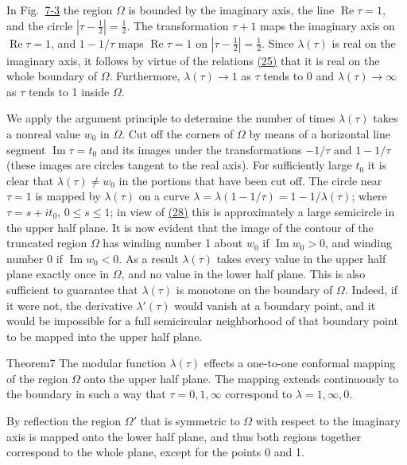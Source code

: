 In Fig.~\hyperref[fig:7-3]{7-3} the region $\Omega$ is bounded by the imaginary axis, the line $\operatorname{Re} \tau = 1$, and the circle $|\tau - \frac{1}{2}| = \frac{1}{2}$. The transformation $\tau + 1$ maps the imaginary axis on $\operatorname{Re} \tau = 1$, and $1 - 1/\tau$ maps $\operatorname{Re} \tau = 1$ on $|\tau - \frac{1}{2}| = \frac{1}{2}$. Since $\lambda(\tau)$ is real on the imaginary axis, it follows by virtue of the relations \hyperref[eq:7.25]{(25)} that it is real on the whole boundary of $\Omega$. Furthermore, $\lambda(\tau) \to 1$ as $\tau$ tends to 0 and $\lambda(\tau) \to \infty$ as $\tau$ tends to 1 inside $\Omega$.

We apply the argument principle to determine the number of times $\lambda(\tau)$ takes a nonreal value $w_{0}$ in $\Omega$. Cut off the corners of $\Omega$ by means of a
horizontal line segment $\operatorname{Im} \tau = t_0$ and its images under the transformations $-1/\tau$ and $1 - 1/\tau$ (these images are circles tangent to the real axis). For sufficiently large $t_0$ it is clear that $\lambda(\tau) \neq w_0$ in the portions that have been cut off. The circle near $\tau = 1$ is mapped by $\lambda(\tau)$ on a curve $\lambda = \lambda(1 - 1/\tau) = 1 - 1/\lambda(\tau)$; where $\tau = s + it_0$, $0 \leq s \leq 1$; in view of \hyperref[eq:7.28]{(28)} this is approximately a large semicircle in the upper half plane. It is now evident that the image of the contour of the truncated region $\Omega$ has winding number 1 about $w_0$ if $\operatorname{Im} w_0 > 0$, and winding number 0 if $\operatorname{Im} w_0 < 0$. As a result $\lambda(\tau)$ takes every value in the upper half plane exactly once in $\Omega$, and no value in the lower half plane. This is also sufficient to guarantee that $\lambda(\tau)$ is monotone on the boundary of $\Omega$. Indeed, if it were not, the derivative $\lambda'(\tau)$ would vanish at a boundary point, and it would be impossible for a full semicircular neighborhood of that boundary point to be mapped into the upper half plane.

\begin{originalstatement}{Theorem}{7}\label{thm:7.7}
The modular function $\lambda(\tau)$ effects a one-to-one conformal mapping of the region $\Omega$ onto the upper half plane. The mapping extends continuously to the boundary in such a way that $\tau = 0, 1, \infty$ correspond to $\lambda = 1, \infty, 0$.
\end{originalstatement}
By reflection the region $\Omega'$ that is symmetric to $\Omega$ with respect to the imaginary axis is mapped onto the lower half plane, and thus both regions together correspond to the whole plane, except for the points 0 and 1.

